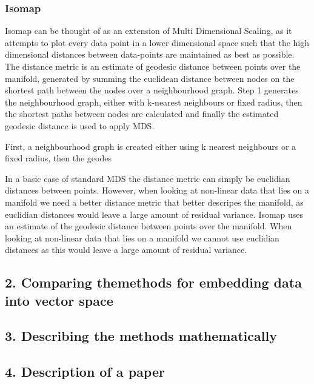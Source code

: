 \documentclass{article}
\begin{document}
		\subsubsection{Isomap}
		Isomap can be thought of as an extension of Multi Dimensional Scaling, as it attempts to plot every data point in a lower dimensional space such that the high dimensional distances between data-points are maintained as best as possible. The distance metric is an estimate of geodesic distance between points over the manifold, generated by summing the euclidean distance between nodes on the shortest path between the nodes over a neighbourhood graph. Step 1 generates the neighbourhood graph, either with k-nearest neighbours or fixed radius, then the shortest paths between nodes are calculated and finally the estimated geodesic distance is used to apply MDS.

First, a neighbourhood graph is created either using k nearest neighbours or a fixed radius, then the geodes

 In a basic case of standard MDS the distance metric can simply be euclidian distances between points. However, when looking at non-linear data that lies on a manifold we need a better distance metric that better descripes the manifold, as euclidian distances would leave a large amount of residual variance. Isomap uses an estimate of the geodesic distance between points over the manifold. 
 When looking at non-linear data that lies on a manifold we cannot use euclidian distances as this would leave a large amount of residual variance.
	\subsection{2. Comparing themethods for embedding data into vector space}
	\subsection{3. Describing the methods mathematically}
	\subsection{4. Description of a paper}
	
\end{document}
